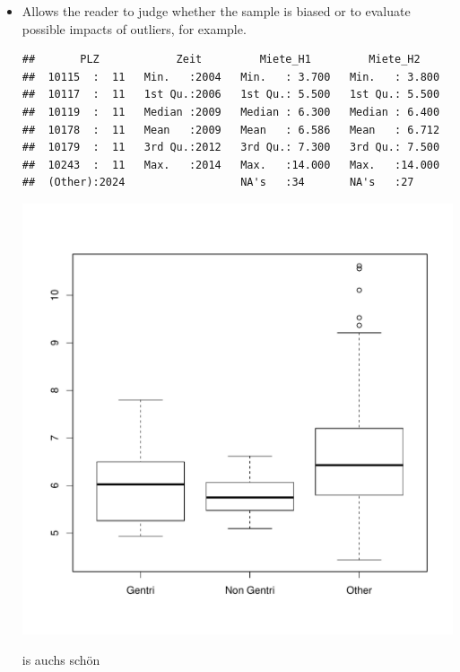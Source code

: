 \documentclass[a4paper,11pt]{article}\usepackage[]{graphicx}\usepackage[]{color}
\makeatletter
\def\maxwidth{ %
  \ifdim\Gin@nat@width>\linewidth
    \linewidth
  \else
    \Gin@nat@width
  \fi
}
\newenvironment{kframe}{%
 \def\at@end@of@kframe{}%
 \ifinner\ifhmode%
  \def\at@end@of@kframe{\end{minipage}}%
  \begin{minipage}{\columnwidth}%
 \fi\fi%
 \def\FrameCommand##1{\hskip\@totalleftmargin \hskip-\fboxsep
 \colorbox{shadecolor}{##1}\hskip-\fboxsep
     \hskip-\linewidth \hskip-\@totalleftmargin \hskip\columnwidth}%
 \MakeFramed {\advance\hsize-\width
   \@totalleftmargin\z@ \linewidth\hsize
   \@setminipage}}%
 {\par\unskip\endMakeFramed%
 \at@end@of@kframe}
\newenvironment{knitrout}{}{} %
\makeatother
\begin{document}
\begin{itemize}
    \item Allows the reader to judge whether the sample is biased or to evaluate possible impacts of outliers, for
    example.
    
\begin{knitrout}
\color{fgcolor}\begin{kframe}
\begin{verbatim}
##       PLZ            Zeit         Miete_H1         Miete_H2     
##  10115  :  11   Min.   :2004   Min.   : 3.700   Min.   : 3.800  
##  10117  :  11   1st Qu.:2006   1st Qu.: 5.500   1st Qu.: 5.500  
##  10119  :  11   Median :2009   Median : 6.300   Median : 6.400  
##  10178  :  11   Mean   :2009   Mean   : 6.586   Mean   : 6.712  
##  10179  :  11   3rd Qu.:2012   3rd Qu.: 7.300   3rd Qu.: 7.500  
##  10243  :  11   Max.   :2014   Max.   :14.000   Max.   :14.000  
##  (Other):2024                  NA's   :34       NA's   :27
\end{verbatim}
\end{kframe}
\includegraphics[width=\maxwidth]{figure/unnamed-chunk-4-1} 

\end{knitrout}

\cite{Wyly2010} is auchs schön

\end{itemize}
\end{document}
